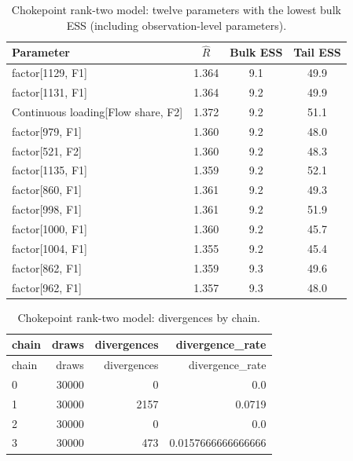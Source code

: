 \documentclass[pdftex,12pt,openright,a4paper,oneside]{book}
\begin{document}
\begin{table}[H]
\centering
\caption{Chokepoint rank-two model: twelve parameters
with the lowest bulk ESS (including observation-level
parameters).}
\label{tab:chokepoint_rank2_lowest_ess}
\small
\begin{tabular}{lccc}
\hline
Parameter & $\widehat{R}$ & Bulk ESS & Tail ESS \\
\hline
factor[1129, F1] & 1.364 & 9.1 & 49.9 \\
factor[1131, F1] & 1.364 & 9.2 & 49.9 \\
Continuous loading[Flow share, F2] & 1.372 & 9.2 & 51.1 \\
factor[979, F1] & 1.360 & 9.2 & 48.0 \\
factor[521, F2] & 1.360 & 9.2 & 48.3 \\
factor[1135, F1] & 1.359 & 9.2 & 52.1 \\
factor[860, F1] & 1.361 & 9.2 & 49.3 \\
factor[998, F1] & 1.361 & 9.2 & 51.9 \\
factor[1000, F1] & 1.360 & 9.2 & 45.7 \\
factor[1004, F1] & 1.355 & 9.2 & 45.4 \\
factor[862, F1] & 1.359 & 9.3 & 49.6 \\
factor[962, F1] & 1.357 & 9.3 & 48.0 \\
\hline
\end{tabular}
\end{table}

\begin{longtable}{@{}p{}rrr@{}}

\caption{Chokepoint rank-two model: divergences by chain.}\label{tab:chokepoint_rank2_divergences}\\

\toprule

chain & draws & divergences & divergence\_rate \\

\midrule\endfirsthead

\toprule

chain & draws & divergences & divergence\_rate \\

\midrule\endhead

0 & 30000 & 0 & 0.0 \\

1 & 30000 & 2157 & 0.0719 \\

2 & 30000 & 0 & 0.0 \\

3 & 30000 & 473 & 0.0157666666666666 \\

\bottomrule\end{longtable}
\end{document}
